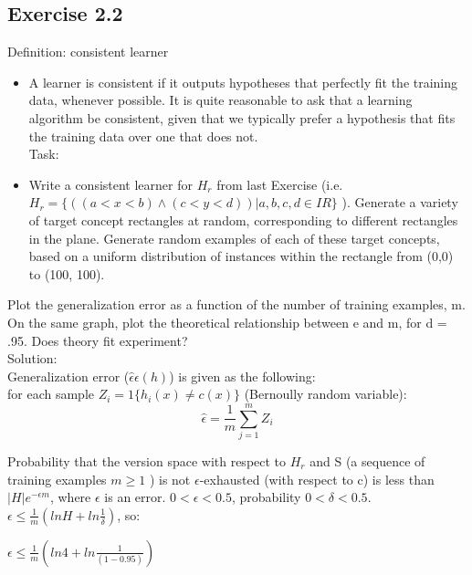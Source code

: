 \documentclass[a4paper, 12pt]{article}
\begin{document}
\subsection*{Exercise 2.2}

Definition: consistent learner

\begin{itemize}
\item A learner is consistent if it outputs hypotheses that perfectly fit the training data, whenever possible. It is quite reasonable to ask that a learning algorithm be consistent, given that we typically prefer a hypothesis that fits the training data over one that does not. \\

Task:
\item Write a consistent learner for $H_r$ from last Exercise (i.e. $H_r = \{((a < x < b) \wedge (c < y < d)) | a, b, c, d \in IR\}$ ). Generate a variety of target concept rectangles at random, corresponding to different rectangles in the plane. Generate random examples of each of these target concepts, based on a uniform distribution of instances within the rectangle from (0,0) to (100, 100).

\end{itemize}

Plot the generalization error  as a function of the number of training examples, m. On the same graph, plot the theoretical relationship between e and m, for d = .95. Does theory fit experiment?\\

Solution:\\

Generalization error ($ \hat{\epsilon}\epsilon (h)$) is given as the following:\\

for each sample $Z_i = 1\{ h_i(x) \neq c(x) \}$ (Bernoully random variable):\\

$$\hat{\epsilon} = \frac{1}{m}\sum_{j=1}^{m} Z_i$$

Probability that the version space with respect to $H_r$ and S (a sequence of training examples $m\geqslant 1$ ) is not $\epsilon$-exhausted (with respect to c) is less than $|H| e^{-\epsilon m}$, where  $\epsilon$ is an error. $0<\epsilon<0.5$, probability $0<\delta<0.5$.\\

$\epsilon \leqslant \frac{1}{m}(lnH + ln\frac{1}{\delta})$, so:

$\epsilon \leqslant \frac{1}{m}(ln4 + ln\frac{1}{(1-0.95)})$\\
\end{document}
